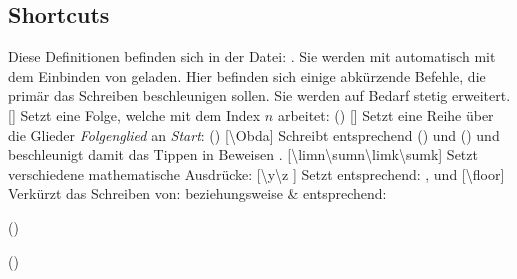 \subsection[Shortcuts \LILLYxBOXxVersion{\small 1.0.8}]{Shortcuts}
Diese Definitionen befinden sich in der Datei: . Sie werden mit  automatisch mit dem Einbinden von  geladen.\medskip
Hier befinden sich einige abkürzende Befehle, die primär das Schreiben beschleunigen sollen. Sie werden auf Bedarf stetig erweitert.\medskip\newline
%
%
%
[]
Setzt eine Folge, welche mit dem Index $n$ arbeitet:  (\folge)\medskip\newline
%
%
%
[]
Setzt eine Reihe über die Glieder \emph{Folgenglied} an \emph{Start}:  (\reihe)\medskip\newline
%
%
%
[\cmdlist \textbackslash Obda]
Schreibt entsprechend  () und  () und beschleunigt damit das Tippen in Beweisen \Smiley.\medskip\newline
%
%
%
[\cmdlist \textbackslash limn\cmdlist \textbackslash sumn\cmdlist \textbackslash limk\cmdlist \textbackslash sumk]
Setzt verschiedene mathematische Ausdrücke:
%
%
%
[\cmdlist \textbackslash y\cmdlist \textbackslash z \cmdold]
Setzt entsprechend: \x[], \y und \z\medskip\newline
%
%
%
[\cmdlist \textbackslash floor]
Verkürzt das Schreiben von:  beziehungsweise \& entsprechend:
\begin{multicols}{2}%
    \begin{ditemize}
        \item {} ()%
        \item {} ()%
    \end{ditemize}
\end{multicols}



